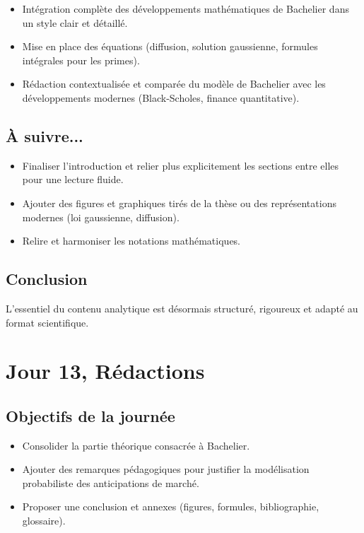 \documentclass[a4paper,11pt]{article}
\begin{document}
\begin{itemize}
    \item Intégration complète des développements mathématiques de Bachelier dans un style clair et détaillé.
    \item Mise en place des équations (diffusion, solution gaussienne, formules intégrales pour les primes).
    \item Rédaction contextualisée et comparée du modèle de Bachelier avec les développements modernes (Black-Scholes, finance quantitative).
\end{itemize}

\subsection{À suivre...}

\begin{itemize}
    \item Finaliser l'introduction et relier plus explicitement les sections entre elles pour une lecture fluide.
    \item Ajouter des figures et graphiques tirés de la thèse ou des représentations modernes (loi gaussienne, diffusion).
    \item Relire et harmoniser les notations mathématiques.
\end{itemize}

\subsection{Conclusion}

L’essentiel du contenu analytique est désormais structuré, rigoureux et adapté au format scientifique.

\newpage



\section{Jour 13, Rédactions}

\subsection{Objectifs de la journée}
\begin{itemize}
    \item Consolider la partie théorique consacrée à Bachelier.
    \item Ajouter des remarques pédagogiques pour justifier la modélisation probabiliste des anticipations de marché.
    \item Proposer une conclusion et annexes (figures, formules, bibliographie, glossaire).
\end{itemize}
\end{document}
